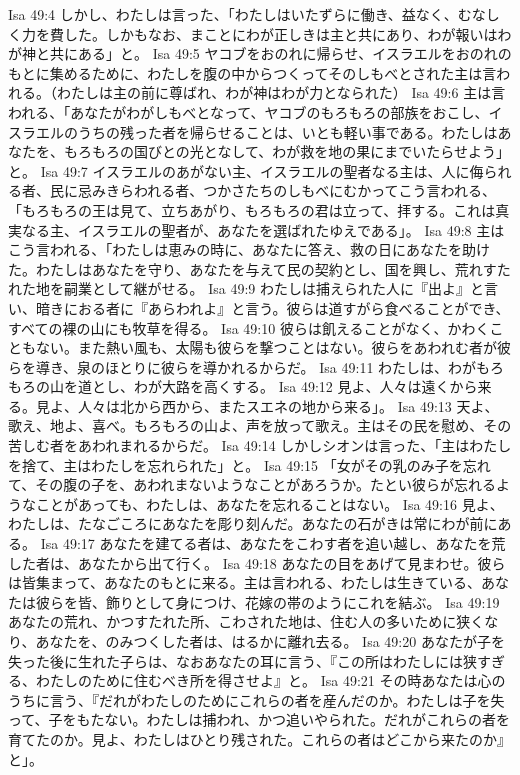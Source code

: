 Isa 49:4  しかし、わたしは言った、「わたしはいたずらに働き、益なく、むなしく力を費した。しかもなお、まことにわが正しきは主と共にあり、わが報いはわが神と共にある」と。
Isa 49:5  ヤコブをおのれに帰らせ、イスラエルをおのれのもとに集めるために、わたしを腹の中からつくってそのしもべとされた主は言われる。（わたしは主の前に尊ばれ、わが神はわが力となられた）
Isa 49:6  主は言われる、「あなたがわがしもべとなって、ヤコブのもろもろの部族をおこし、イスラエルのうちの残った者を帰らせることは、いとも軽い事である。わたしはあなたを、もろもろの国びとの光となして、わが救を地の果にまでいたらせよう」と。
Isa 49:7  イスラエルのあがない主、イスラエルの聖者なる主は、人に侮られる者、民に忌みきらわれる者、つかさたちのしもべにむかってこう言われる、「もろもろの王は見て、立ちあがり、もろもろの君は立って、拝する。これは真実なる主、イスラエルの聖者が、あなたを選ばれたゆえである」。
Isa 49:8  主はこう言われる、「わたしは恵みの時に、あなたに答え、救の日にあなたを助けた。わたしはあなたを守り、あなたを与えて民の契約とし、国を興し、荒れすたれた地を嗣業として継がせる。
Isa 49:9  わたしは捕えられた人に『出よ』と言い、暗きにおる者に『あらわれよ』と言う。彼らは道すがら食べることができ、すべての裸の山にも牧草を得る。
Isa 49:10  彼らは飢えることがなく、かわくこともない。また熱い風も、太陽も彼らを撃つことはない。彼らをあわれむ者が彼らを導き、泉のほとりに彼らを導かれるからだ。
Isa 49:11  わたしは、わがもろもろの山を道とし、わが大路を高くする。
Isa 49:12  見よ、人々は遠くから来る。見よ、人々は北から西から、またスエネの地から来る」。
Isa 49:13  天よ、歌え、地よ、喜べ。もろもろの山よ、声を放って歌え。主はその民を慰め、その苦しむ者をあわれまれるからだ。
Isa 49:14  しかしシオンは言った、「主はわたしを捨て、主はわたしを忘れられた」と。
Isa 49:15  「女がその乳のみ子を忘れて、その腹の子を、あわれまないようなことがあろうか。たとい彼らが忘れるようなことがあっても、わたしは、あなたを忘れることはない。
Isa 49:16  見よ、わたしは、たなごころにあなたを彫り刻んだ。あなたの石がきは常にわが前にある。
Isa 49:17  あなたを建てる者は、あなたをこわす者を追い越し、あなたを荒した者は、あなたから出て行く。
Isa 49:18  あなたの目をあげて見まわせ。彼らは皆集まって、あなたのもとに来る。主は言われる、わたしは生きている、あなたは彼らを皆、飾りとして身につけ、花嫁の帯のようにこれを結ぶ。
Isa 49:19  あなたの荒れ、かつすたれた所、こわされた地は、住む人の多いために狭くなり、あなたを、のみつくした者は、はるかに離れ去る。
Isa 49:20  あなたが子を失った後に生れた子らは、なおあなたの耳に言う、『この所はわたしには狭すぎる、わたしのために住むべき所を得させよ』と。
Isa 49:21  その時あなたは心のうちに言う、『だれがわたしのためにこれらの者を産んだのか。わたしは子を失って、子をもたない。わたしは捕われ、かつ追いやられた。だれがこれらの者を育てたのか。見よ、わたしはひとり残された。これらの者はどこから来たのか』と」。
